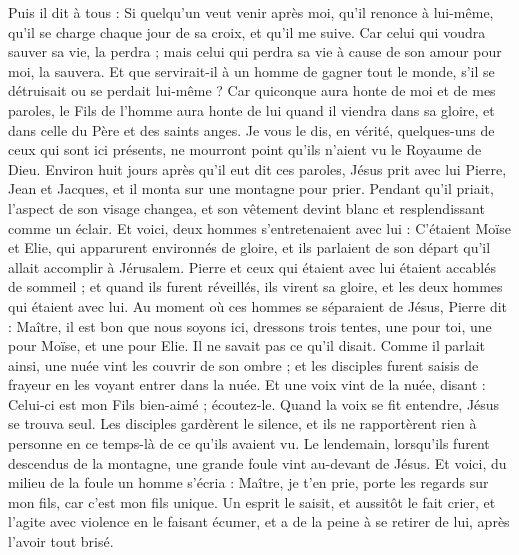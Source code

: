 \begin{multicols}{2}
Puis il dit à tous : Si quelqu'un veut venir après moi, qu'il renonce à lui-même, qu'il se charge chaque jour de sa croix, et qu'il me suive.
Car celui qui voudra sauver sa vie, la perdra ; mais celui qui perdra sa vie à cause de son amour pour moi, la sauvera.
Et que servirait-il à un homme de gagner tout le monde, s'il se détruisait ou se perdait lui-même ?
Car quiconque aura honte de moi et de mes paroles, le Fils de l'homme aura honte de lui quand il viendra dans sa gloire, et dans celle du Père et des saints anges.
Je vous le dis, en vérité, quelques-uns de ceux qui sont ici présents, ne mourront point qu'ils n'aient vu le Royaume de Dieu.
Environ huit jours après qu'il eut dit ces paroles, Jésus prit avec lui Pierre, Jean et Jacques, et il monta sur une montagne pour prier.
Pendant qu'il priait, l'aspect de son visage changea, et son vêtement devint blanc et resplendissant comme un éclair.
Et voici, deux hommes s'entretenaient avec lui : C'étaient Moïse et Elie,
qui apparurent environnés de gloire, et ils parlaient de son départ qu'il allait accomplir à Jérusalem.
Pierre et ceux qui étaient avec lui étaient accablés de sommeil ; et quand ils furent réveillés, ils virent sa gloire, et les deux hommes qui étaient avec lui.
Au moment où ces hommes se séparaient de Jésus, Pierre dit : Maître, il est bon que nous soyons ici, dressons trois tentes, une pour toi, une pour Moïse, et une pour Elie. Il ne savait pas ce qu'il disait.
Comme il parlait ainsi, une nuée vint les couvrir de son ombre ; et les disciples furent saisis de frayeur en les voyant entrer dans la nuée.
Et une voix vint de la nuée, disant : Celui-ci est mon Fils bien-aimé ; écoutez-le.
Quand la voix se fit entendre, Jésus se trouva seul. Les disciples gardèrent le silence, et ils ne rapportèrent rien à personne en ce temps-là de ce qu'ils avaient vu.
Le lendemain, lorsqu'ils furent descendus de la montagne, une grande foule vint au-devant de Jésus.
Et voici, du milieu de la foule un homme s'écria : Maître, je t'en prie, porte les regards sur mon fils, car c'est mon fils unique.
Un esprit le saisit, et aussitôt le fait crier, et l'agite avec violence en le faisant écumer, et a de la peine à se retirer de lui, après l'avoir tout brisé.

\end{multicols}
